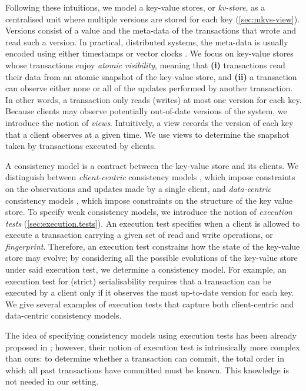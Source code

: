 Following these intuitions, we model a key-value stores, or \emph{kv-store}, as a centralised unit where multiple versions 
are stored for each key (\cref{sec:mkvs-view}). Versions consist of a value and the meta-data of the transactions that wrote and 
read such a version. In practical, distributed systems, the meta-data is usually encoded using either timestamps 
\cite{physicsnmsi,clockSI} or vector clocks \cite{gdur}. We focus on key-value stores whose transactions 
enjoy \emph{atomic visibility}, meaning that \textbf{(i)} transactions read their data from an atomic 
snapshot of the key-value store, and \textbf{(ii)} a transaction can observe either none or all 
of the updates performed by another transaction. In other words, a transaction only reads (writes) at most 
one version for each key.
Because clients may observe potentially out-of-date versions of the system, we introduce the notion of \emph{views}. 
Intuitively, a view records the version of each key that a client observes at a given time. We use views 
to determine the snapshot taken by transactions executed by clients.

A consistency model is a contract between the key-value store and its clients. We distinguish 
between \emph{client-centric} consistency models \cite{terry1994session}, 
which impose constraints on the observations and updates made by a single client, 
and \emph{data-centric} consistency models \cite{framework-concur}, which impose constraints 
on the structure of the key value store.
To specify weak consistency models, 
we introduce the notion of \emph{execution tests} (\cref{sec:execution.tests}). An execution test
 specifies when a client is allowed to execute a transaction carrying a given 
set of read and write operations, or \emph{fingerprint}. Therefore, an execution 
test constrains how the state of the key-value store may evolve;
by considering all the possible evolutions of the key-value store under said execution test, 
we determine a consistency model. For example, an execution test for (strict) serialisability 
requires that a transaction can be executed by a client only if it observes the most up-to-date 
version for each key. 
We give several examples of execution tests that capture both client-centric and 
data-centric consistency models. 

The idea of specifying consistency models using execution tests has been 
already proposed in \cite{seebelieve}; however, their notion of execution 
test is intrinsically more complex than ours: to determine 
whether a transaction can commit, the total order in which all past transactions 
have committed must be known. This knowledge is not needed in our setting.


